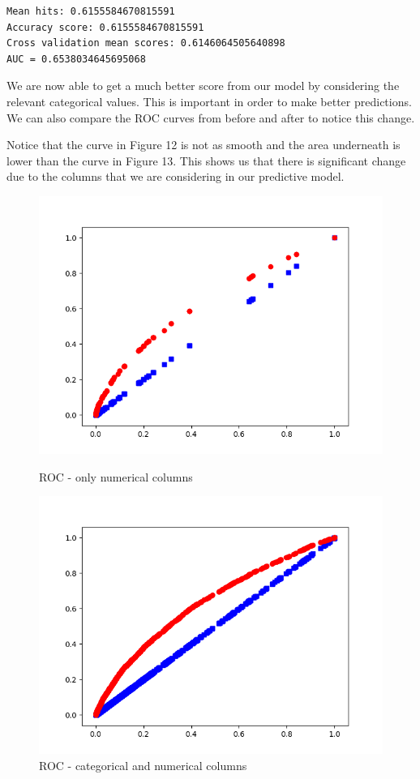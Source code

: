 \documentclass[11pt]{report}
\newcommand{\linespace}{\vspace{0.3cm}\noindent}
\begin{document}
\begin{lstlisting}
Mean hits: 0.6155584670815591
Accuracy score: 0.6155584670815591
Cross validation mean scores: 0.6146064505640898
AUC = 0.6538034645695068
\end{lstlisting}

\noindent
We are now able to get a much better score from our model by considering the relevant categorical values. This is important in order to make better predictions. We can also compare the ROC curves from before and after to notice this change.

\linespace
Notice that the curve in Figure 12 is not as smooth and the area underneath is lower than the curve in Figure 13. This shows us that there is significant change due to the columns that we are considering in our predictive model. 
\newpage
\begin{figure}[ht]
	\begin{minipage}[b]{.5\textwidth}
	\centering
	\includegraphics[width=1\textwidth]{roc_curve.png}
	\caption{ROC - only numerical columns}
	\end{minipage}
	\hfill
	\begin{minipage}[b]{.5\textwidth}
	\centering
	\includegraphics[width=1\textwidth]{roc_mixofnumcat.png}
\caption{ROC - categorical and numerical columns}
\end{minipage}
\end{figure}
\end{document}
